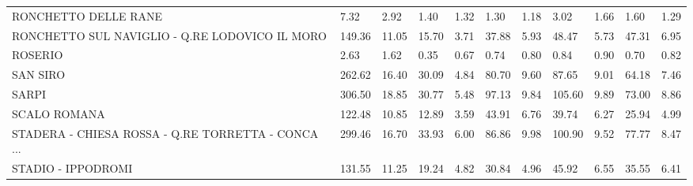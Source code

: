 \begin{table}[H]
{{\begin{tabular}{lp{1.3cm}p{1.3cm}p{1.3cm}p{1.3cm}p{1.3cm}p{1.3cm}p{1.3cm}p{1.3cm}p{1.3cm}p{1.3cm}}
RONCHETTO DELLE RANE                               &                      7.32 &                  2.92 &                        1.40 &                    1.32 &                        1.30 &                    1.18 &                        3.02 &                    1.66 &                      1.60 &                  1.29 \\
RONCHETTO SUL NAVIGLIO - Q.RE LODOVICO IL MORO     &                    149.36 &                 11.05 &                       15.70 &                    3.71 &                       37.88 &                    5.93 &                       48.47 &                    5.73 &                     47.31 &                  6.95 \\
ROSERIO                                            &                      2.63 &                  1.62 &                        0.35 &                    0.67 &                        0.74 &                    0.80 &                        0.84 &                    0.90 &                      0.70 &                  0.82 \\
SAN SIRO                                           &                    262.62 &                 16.40 &                       30.09 &                    4.84 &                       80.70 &                    9.60 &                       87.65 &                    9.01 &                     64.18 &                  7.46 \\
SARPI                                              &                    306.50 &                 18.85 &                       30.77 &                    5.48 &                       97.13 &                    9.84 &                      105.60 &                    9.89 &                     73.00 &                  8.86 \\
SCALO ROMANA                                       &                    122.48 &                 10.85 &                       12.89 &                    3.59 &                       43.91 &                    6.76 &                       39.74 &                    6.27 &                     25.94 &                  4.99 \\
STADERA - CHIESA ROSSA - Q.RE TORRETTA - CONCA ... &                    299.46 &                 16.70 &                       33.93 &                    6.00 &                       86.86 &                    9.98 &                      100.90 &                    9.52 &                     77.77 &                  8.47 \\
STADIO - IPPODROMI                                 &                    131.55 &                 11.25 &                       19.24 &                    4.82 &                       30.84 &                    4.96 &                       45.92 &                    6.55 &                     35.55 &                  6.41 \\

\end{tabular}}}
\end{table}
